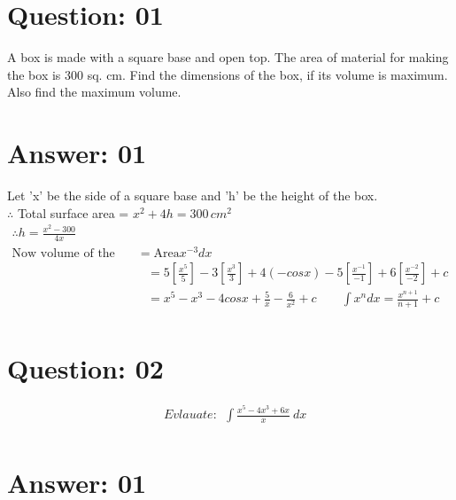 \documentclass[17pt]{extarticle}
\begin{document}
\noindent
\begin{fleqn} 


\section{Question: 01}
A box is made with a square base and open top. The area of material for making the box is 300 sq. cm. Find the dimensions of the box, if its volume is maximum. Also find the maximum volume.


\section{Answer: 01}
Let  'x'  be the side of a square base and  'h' be the height of the box.\\
$\therefore$ Total surface area = $x^2+4h = 300\,cm^2$
\begin{equation} \nonumber
\begin{alignedat}{4}
\therefore h = \frac{x^2-300}{4x} \\
\text{Now volume of the box V} = \text{Area} x^{-3}dx\\
&= 5\left[\frac{x^5}{5}\right]-3\left[\frac{x^3}{3}\right]+4(-cos x)-5\left[\frac{x^{-1}}{-1} \right]+6\left[\frac{x^{-2}}{-2} \right]+c\\
&= x^5 - x^3 - 4cosx + \frac{5}{x} - \frac{6}{x^2}+c \quad \boxed{\quad\int x^ndx = \frac{x^{n+1}}{n+1}+c\ }\\
\end{alignedat}
\end{equation}


\section{Question: 02}

\begin{equation} \nonumber
\begin{alignedat}{4}
& Evlauate :\ \  \int \frac{x^5 - 4x^3 + 6x}{x}\ dx\\
\end{alignedat}
\end{equation}



\section{Answer: 01}


\end{fleqn}
\end{document}
